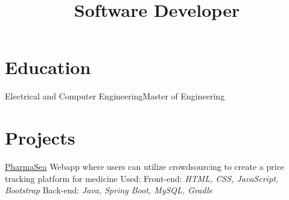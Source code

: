 \documentclass[11pt,a4paper,sans]{moderncv} %
\title{Software Developer}
\begin{document}

\makecvtitle %


\section{Education}

{\newline Electrical and Computer Engineering}{Master of Engineering}{}{}  %





\section{Projects}

\cventry{}
{\href{https://github.com/Nickgraviton/pharmasea}{PharmaSea}}
{\newline Webapp where users can utilize crowdsourcing to create a price tracking platform for medicine}
{\newline Used:
\newline Front-end: \emph{HTML, CSS, JavaScript, Bootstrap}
\newline Back-end: \emph{Java, Spring Boot, MySQL, Gradle}}{}{}
\end{document}
